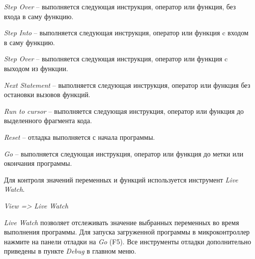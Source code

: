 \textit{Step Over } -- выполняется следующая инструкция, оператор или функция, без входа в саму функцию.

\textit{Step Into } -- выполняется следующая инструкция, оператор или функция c входом в саму функцию.

\textit{Step Over } -- выполняется следующая инструкция, оператор или функция c выходом из функции.

\textit{Next Statement} -- выполняется следующая инструкция, оператор или функция без остановки вызовов функций.

\textit{Run to cursor} --  выполняется следующая инструкция, оператор или функция до выделенного фрагмента кода.

\textit{Reset} -- отладка выполняется с начала программы.

\textit{Go} -- выполняется следующая инструкция, оператор или функция до метки или окончания программы.

Для контроля значений переменных и функций используется инструмент \textit{Live Watch}. 
\begin{center}
\textit{View => Live Watch}
\end{center}
\textit{Live Watch} позволяет отслеживать значение выбранных переменных во время выполнения программы.
	Для запуска загруженной программы в микроконтроллер нажмите на панели отладки на \textit{Go} (F5).
	Все инструменты отладки дополнительно приведены в пункте \textit{Debug} в главном меню.





